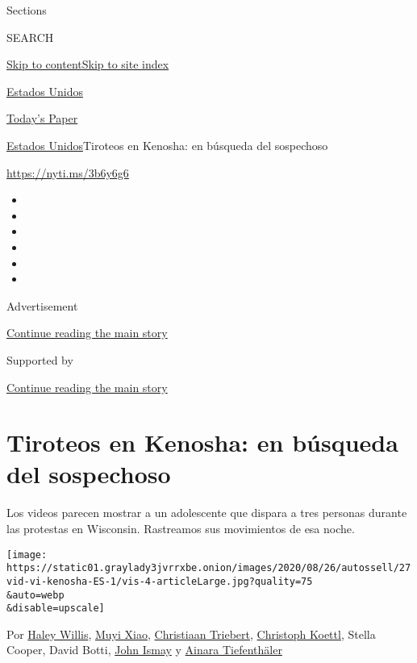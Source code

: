Sections

SEARCH

\protect\hyperlink{site-content}{Skip to
content}\protect\hyperlink{site-index}{Skip to site index}

\href{https://www.nytimes3xbfgragh.onion/es/section/estados-unidos}{Estados
Unidos}

\href{https://myaccount.nytimes3xbfgragh.onion/auth/login?response_type=cookie\&client_id=vi}{}

\href{https://www.nytimes3xbfgragh.onion/section/todayspaper}{Today's
Paper}

\href{/es/section/estados-unidos}{Estados Unidos}\textbar{}Tiroteos en
Kenosha: en búsqueda del sospechoso

\url{https://nyti.ms/3b6y6g6}

\begin{itemize}
\item
\item
\item
\item
\item
\item
\end{itemize}

Advertisement

\protect\hyperlink{after-top}{Continue reading the main story}

Supported by

\protect\hyperlink{after-sponsor}{Continue reading the main story}

\hypertarget{tiroteos-en-kenosha-en-buxfasqueda-del-sospechoso}{%
\section{Tiroteos en Kenosha: en búsqueda del
sospechoso}\label{tiroteos-en-kenosha-en-buxfasqueda-del-sospechoso}}

Los videos parecen mostrar a un adolescente que dispara a tres personas
durante las protestas en Wisconsin. Rastreamos sus movimientos de esa
noche.

\texttt{[image: https://static01.graylady3jvrrxbe.onion/images/2020/08/26/autossell/27vid-vi-kenosha-ES-1/vis-4-articleLarge.jpg?quality=75\\\&auto=webp\\\&disable=upscale]}

Por \href{https://www.nytimes3xbfgragh.onion/by/haley-willis}{Haley
Willis}, \href{https://www.nytimes3xbfgragh.onion/by/muyi-xiao}{Muyi
Xiao},
\href{http://nytimes3xbfgragh.onion/by/christiaan-triebert}{Christiaan
Triebert},
\href{https://www.nytimes3xbfgragh.onion/by/christoph-koettl}{Christoph
Koettl}, Stella Cooper, David Botti,
\href{https://www.nytimes3xbfgragh.onion/by/john-ismay}{John Ismay} y
\href{https://www.nytimes3xbfgragh.onion/by/ainara-tiefenthaler}{Ainara
Tiefenthäler}

